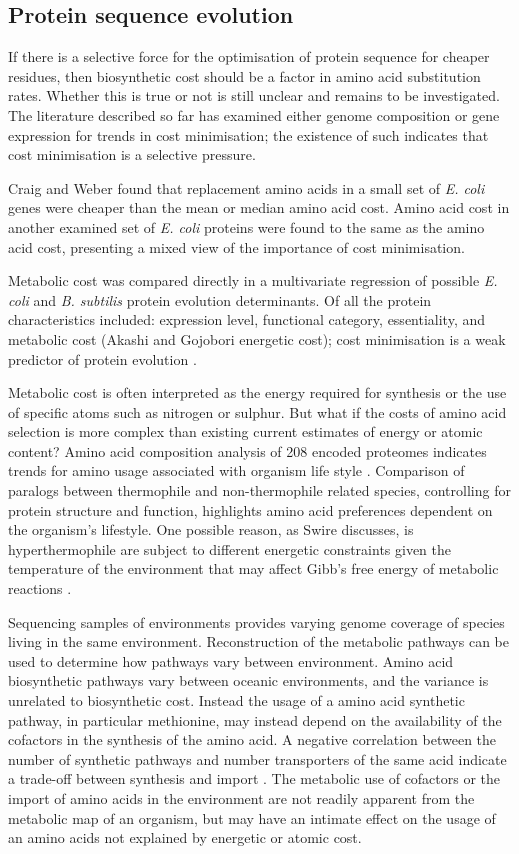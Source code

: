 \subsection{Protein sequence evolution}

If there is a selective force for the optimisation of protein sequence for cheaper residues, then biosynthetic cost should be a factor in amino acid substitution rates. Whether this is true or not is still unclear and remains to be investigated. The literature described so far has examined either genome composition or gene expression for trends in cost minimisation; the existence of such indicates that cost minimisation is a selective pressure.

Craig and Weber \cite{craig1998} found that replacement amino acids in a small set of \emph{E. coli} genes were cheaper than the mean or median amino acid cost. Amino acid cost in another examined set of \emph{E. coli} proteins were found to the same as the amino acid cost, presenting a mixed view of the importance of cost minimisation.

Metabolic cost was compared directly in a multivariate regression of possible \emph{E. coli} and \emph{B. subtilis} protein evolution determinants. Of all the protein characteristics included: expression level, functional category, essentiality, and metabolic cost (Akashi and Gojobori energetic cost\cite{akashi2002}); cost minimisation is a weak predictor of protein evolution \cite{rocha2004}.

Metabolic cost is often interpreted as the energy required for synthesis or the use of specific atoms such as nitrogen or sulphur. But what if the costs of amino acid selection is more complex than existing current estimates of energy or atomic content? Amino acid composition analysis of 208 encoded proteomes indicates trends for amino usage associated with organism life style \cite{tekaia2006}. Comparison of paralogs between thermophile and non-thermophile related species, controlling for protein structure and function, highlights amino acid preferences dependent on the organism's lifestyle. One possible reason, as Swire discusses, is hyperthermophile are subject to different energetic constraints given the temperature of the environment that may affect Gibb's free energy of metabolic reactions \cite{swire2007}.

Sequencing samples of environments provides varying genome coverage of species living in the same environment. Reconstruction of the metabolic pathways can be used to determine how pathways vary between environment. Amino acid biosynthetic pathways vary between oceanic environments, and the variance is unrelated to biosynthetic cost. Instead the usage of a amino acid synthetic pathway, in particular methionine, may instead depend on the availability of the cofactors in the synthesis of the amino acid. A negative correlation between the number of synthetic pathways and number transporters of the same acid indicate a trade-off between synthesis and import \cite{gianoulis2009}. The metabolic use of cofactors or the import of amino acids in the environment are not readily apparent from the metabolic map of an organism, but may have an intimate effect on the usage of an amino acids not explained by energetic or atomic cost.

